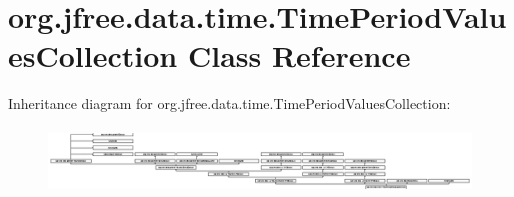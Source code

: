 \hypertarget{classorg_1_1jfree_1_1data_1_1time_1_1_time_period_values_collection}{}\section{org.\+jfree.\+data.\+time.\+Time\+Period\+Values\+Collection Class Reference}
\label{classorg_1_1jfree_1_1data_1_1time_1_1_time_period_values_collection}
Inheritance diagram for org.\+jfree.\+data.\+time.\+Time\+Period\+Values\+Collection\+:\begin{figure}[H]
\begin{center}
\leavevmode
\includegraphics[height=1.768421cm]{classorg_1_1jfree_1_1data_1_1time_1_1_time_period_values_collection}
\end{center}
\end{figure}
